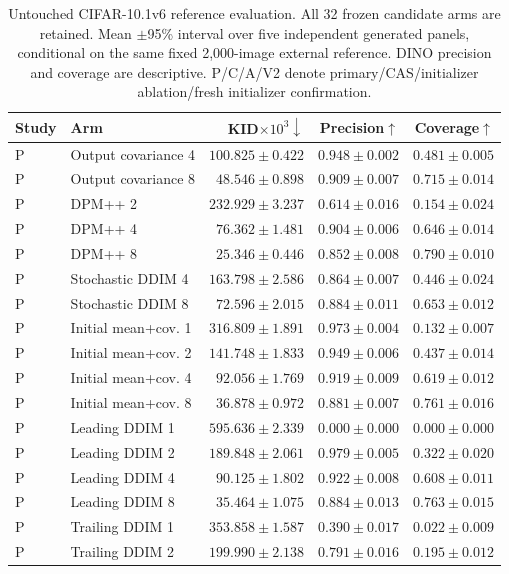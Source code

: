 \begin{table}[t]
\centering\footnotesize
\setlength{\tabcolsep}{4pt}
\caption{Untouched CIFAR-10.1v6 reference evaluation. All 32 frozen candidate arms are retained. Mean $\pm$95\% interval over five independent generated panels, conditional on the same fixed 2,000-image external reference. DINO precision and coverage are descriptive. P/C/A/V2 denote primary/CAS/initializer ablation/fresh initializer confirmation.}
\label{tab:cifar101_all}
\begin{tabular}{llrrr}
\toprule
Study & Arm & KID$\times10^3\downarrow$ & Precision$\uparrow$ & Coverage$\uparrow$ \\
\midrule
P & Output covariance 4 & $100.825\pm0.422$ & $0.948\pm0.002$ & $0.481\pm0.005$ \\
P & Output covariance 8 & $48.546\pm0.898$ & $0.909\pm0.007$ & $0.715\pm0.014$ \\
P & DPM++ 2 & $232.929\pm3.237$ & $0.614\pm0.016$ & $0.154\pm0.024$ \\
P & DPM++ 4 & $76.362\pm1.481$ & $0.904\pm0.006$ & $0.646\pm0.014$ \\
P & DPM++ 8 & $25.346\pm0.446$ & $0.852\pm0.008$ & $0.790\pm0.010$ \\
P & Stochastic DDIM 4 & $163.798\pm2.586$ & $0.864\pm0.007$ & $0.446\pm0.024$ \\
P & Stochastic DDIM 8 & $72.596\pm2.015$ & $0.884\pm0.011$ & $0.653\pm0.012$ \\
P & Initial mean+cov. 1 & $316.809\pm1.891$ & $0.973\pm0.004$ & $0.132\pm0.007$ \\
P & Initial mean+cov. 2 & $141.748\pm1.833$ & $0.949\pm0.006$ & $0.437\pm0.014$ \\
P & Initial mean+cov. 4 & $92.056\pm1.769$ & $0.919\pm0.009$ & $0.619\pm0.012$ \\
P & Initial mean+cov. 8 & $36.878\pm0.972$ & $0.881\pm0.007$ & $0.761\pm0.016$ \\
P & Leading DDIM 1 & $595.636\pm2.339$ & $0.000\pm0.000$ & $0.000\pm0.000$ \\
P & Leading DDIM 2 & $189.848\pm2.061$ & $0.979\pm0.005$ & $0.322\pm0.020$ \\
P & Leading DDIM 4 & $90.125\pm1.802$ & $0.922\pm0.008$ & $0.608\pm0.011$ \\
P & Leading DDIM 8 & $35.464\pm1.075$ & $0.884\pm0.013$ & $0.763\pm0.015$ \\
P & Trailing DDIM 1 & $353.858\pm1.587$ & $0.390\pm0.017$ & $0.022\pm0.009$ \\
P & Trailing DDIM 2 & $199.990\pm2.138$ & $0.791\pm0.016$ & $0.195\pm0.012$ \\

\end{tabular}
\end{table}
